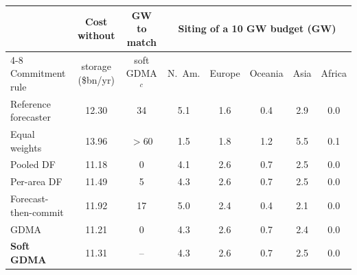 \begin{tabular}{@{}lccccccc@{}}
\toprule
 & Cost without & GW to match & \multicolumn{5}{c}{Siting of a 10 GW budget (GW)} \\
\cmidrule(lr){4-8}
Commitment rule & storage (\$bn/yr) & soft GDMA$^c$ & N.\ Am. & Europe & Oceania & Asia & Africa \\
\midrule
Reference forecaster & 12.30 & 34 & 5.1 & 1.6 & 0.4 & 2.9 & 0.0 \\
Equal weights & 13.96 & $>60$ & 1.5 & 1.8 & 1.2 & 5.5 & 0.1 \\
Pooled DF & 11.18 & 0 & 4.1 & 2.6 & 0.7 & 2.5 & 0.0 \\
Per-area DF & 11.49 & 5 & 4.3 & 2.6 & 0.7 & 2.5 & 0.0 \\
Forecast-then-commit & 11.92 & 17 & 5.0 & 2.4 & 0.4 & 2.1 & 0.0 \\
GDMA & 11.21 & 0 & 4.3 & 2.6 & 0.7 & 2.4 & 0.0 \\
\textbf{Soft GDMA} & 11.31 & -- & 4.3 & 2.6 & 0.7 & 2.5 & 0.0 \\
\bottomrule
\end{tabular}